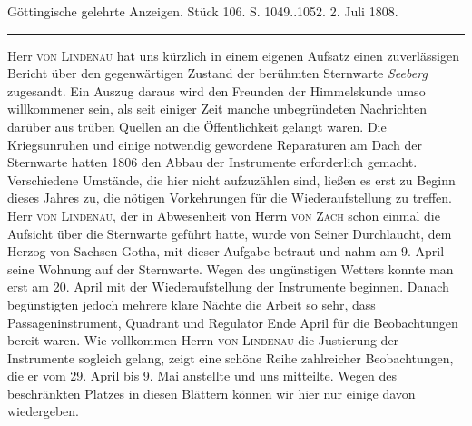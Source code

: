 \clearpage
{}
\hypertarget{native-503-lower}{}\label{native-503-lower}

\begin{center}
\small Göttingische gelehrte Anzeigen. Stück 106. S. 1049..1052. 2. Juli 1808.\\[3pt]
\rule{.72\linewidth}{.3pt}
\end{center}

Herr \textsc{von Lindenau} hat uns kürzlich in einem eigenen Aufsatz einen zuverlässigen Bericht über den gegenwärtigen Zustand der berühmten Sternwarte \emph{Seeberg} zugesandt. Ein Auszug daraus wird den Freunden der Himmelskunde umso willkommener sein, als seit einiger Zeit manche unbegründeten Nachrichten darüber aus trüben Quellen an die Öffentlichkeit gelangt waren. Die Kriegsunruhen und einige notwendig gewordene Reparaturen am Dach der Sternwarte hatten 1806 den Abbau der Instrumente erforderlich gemacht. Verschiedene Umstände, die hier nicht aufzuzählen sind, ließen es erst zu Beginn dieses Jahres zu, die nötigen Vorkehrungen für die Wiederaufstellung zu treffen. Herr \textsc{von Lindenau}, der in Abwesenheit von Herrn \textsc{von Zach} schon einmal die Aufsicht über die Sternwarte geführt hatte, wurde von Seiner Durchlaucht, dem Herzog von Sachsen-Gotha, mit dieser Aufgabe betraut und nahm am 9. April seine Wohnung auf der Sternwarte. Wegen des ungünstigen Wetters konnte man erst am 20. April mit der Wiederaufstellung der Instrumente beginnen. Danach begünstigten jedoch mehrere klare Nächte die Arbeit so sehr, dass Passageninstrument, Quadrant und Regulator Ende April für die Beobachtungen bereit waren. Wie vollkommen Herrn \textsc{von Lindenau} die Justierung der Instrumente sogleich gelang, zeigt eine schöne Reihe zahlreicher Beobachtungen, die er vom 29. April bis 9. Mai anstellte und uns mitteilte. Wegen des beschränkten Platzes in diesen Blättern können wir hier nur einige davon wiedergeben.

